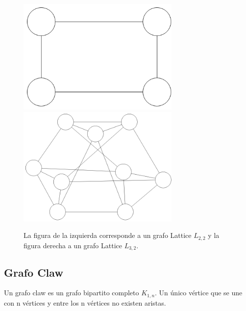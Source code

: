 \begin{figure}[H]
\includegraphics[width=80mm]{L2_2.png}
\includegraphics[width=80mm]{L3_3.png}
\caption{La figura de la izquierda corresponde a un grafo Lattice $L_{2,2}$ y la figura derecha a un grafo Lattice $L_{3,2}$.}
\label{overflow}
\end{figure}

\subsection{Grafo Claw}
Un grafo claw es un grafo bipartito completo $K_{1,n}$. Un único vértice que se une con n vértices y entre los n vértices no existen aristas.

